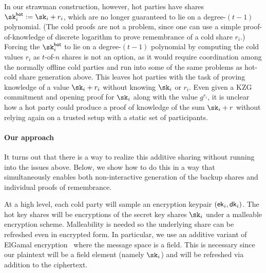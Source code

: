 In our strawman construction, however, hot parties have shares $\sk_i^\hot := \sk_i+r_i$, which are no longer guaranteed to lie on a degree-$(t-1)$ polynomial. (The cold proofs are not a problem, since one can use a simple proof-of-knowledge of discrete logarithm to prove remembrance of a cold share $r_i$.) Forcing the $\sk_i^\hot$ to lie on a degree-$(t-1)$ polynomial by computing the cold values $r_i$ as $t$-of-$n$ shares is not an option, as it would require coordination among the normally offline cold parties and run into some of the same problems as hot-cold share generation above. This leaves hot parties with the task of proving knowledge of a value $\sk_i+r_i$ without knowing $\sk_i$ or $r_i$. Even given a KZG commitment and opening proof for $\sk_i$ along with the value $g^{r_i}$, it is unclear how a hot party could produce a proof of knowledge of the sum $\sk_i+r$ without relying again on a trusted setup with a static set of participants. 



\paragraph{Our approach}
It turns out that there is a way to realize this additive sharing without running into the issues above. Below, we show how to do this in a way that simultaneously enables both non-interactive generation of the backup shares and individual proofs of remembrance.

At a high level, each cold party will sample an encryption keypair $(\mathsf{ek}_i, \mathsf{dk}_i)$. The hot key shares will be encryptions of the secret key shares $\sk_i$ under a malleable encryption scheme. Malleability is needed so the underlying share can be refreshed even in encrypted form. In particular, we use an additive variant of ElGamal encryption~\cite{C:ElGamal84} where the message space is a field. This is necessary since our plaintext will be a field element (namely $\sk_i$) and will be refreshed via addition to the ciphertext.


